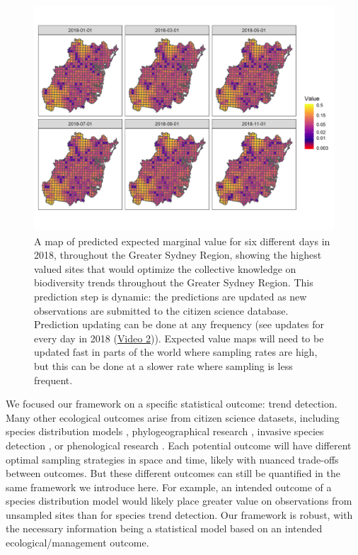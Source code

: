 \documentclass[9pt,twocolumn,twoside,lineno]{pnas-new}
\begin{document}
\begin{figure}[!hb]
\centering
\includegraphics[width=.8\linewidth]{example_maps.png}
\caption{A map of predicted expected marginal value for six different days in 2018, throughout the Greater Sydney Region, showing the highest valued sites that would optimize the collective knowledge on biodiversity trends throughout the Greater Sydney Region. This prediction step is dynamic: the predictions are updated as new observations are submitted to the citizen science database. Prediction updating can be done at any frequency (see updates for every day in 2018 (\href{https://github.com/coreytcallaghan/optimize_citizen_science_obs/blob/master/Figures/dynamic_map.gif}{Video 2})).  Expected value maps will need to be updated fast in parts of the world where sampling rates are high, but this can be done at a slower rate where sampling is less frequent.}
\label{fig3}
\end{figure}

We focused our framework on a specific statistical outcome: trend detection. Many other ecological outcomes arise from citizen science datasets, including species distribution models \cite{bradsworth2017species, van2013opportunistic}, phylogeographical research \cite{bahls2014new, drury2019continent}, invasive species detection \cite{pocock2017citizen, grason2018citizen}, or phenological research \cite{la2014role, supp2015citizen}. Each potential outcome will have different optimal sampling strategies in space and time, likely with nuanced trade-offs between outcomes. But these different outcomes can still be quantified in the same framework we introduce here. For example, an intended outcome of a species distribution model would likely place greater value on observations from unsampled sites \cite{crawley2001scale} than for species trend detection. Our framework is robust, with the necessary information being a statistical model based on an intended ecological/management outcome.
\end{document}
